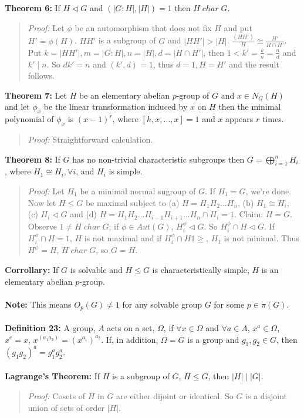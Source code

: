 {\bf Theorem 6:}
If $H \lhd G$ and $(|G:H|, |H|)=1$ then $H \; char \; G$.
\begin{quote}
\emph{Proof:}  Let $\phi$ be an automorphism that does not fix $H$ and put $H'= \phi(H)$.
$H H'$ is a subgroup of $G$ and
$|H H'| > |H|$.  ${\frac {(H H')} {H}} \cong {\frac {H'} {H \cap H'}}$.
Put $k= |H H'|, m= |G:H|, n= |H|, d= | H \cap H' |$,  then $ 1 < k'= {\frac {k} {n}} =  {\frac n d}$ and $k' \mid n$.  So $dk'= n$ and $(k', d)=1$,
thus $d=1, H = H'$ and the result follows.
\end{quote}
{\bf Theorem 7:}
Let $H$ be an elementary abelian $p$-group of $G$ and $x \in N_G(H)$ and let $\phi_x$
be the linear transformation induced by $x$ on $H$ then the minimal polynomial of
$\phi_x$ is $(x-1)^r$, where $[h,x, \ldots, x]= 1$ and $x$ appears $r$ times.
\begin{quote}
\emph{Proof:}  Straightforward calculation.
\end{quote}
{\bf Theorem 8:}  If $G$ has no non-trivial characteristic subgroups then
$G= \bigoplus_{i=1}^n H_i$, where $H_1 \cong H_i, \forall i$, and $H_i$ is
simple.
\begin{quote}
\emph{Proof:} Let $H_1$ be a minimal normal sugroup of $G$.  If $H_1 = G$, we're done.
Now let $H \le G$ be maximal subject to (a) $H=H_1 H_2 \ldots H_n$, (b) $H_1 \cong H_i$,
(c) $H_i \lhd G$ and (d)
$H=H_1 H_2 \ldots H_{i-1} H_{i+1} \ldots H_n \cap H_i = 1$.  Claim:  $H=G$.  Observe
$1 \ne H \; char \; G$; if $\phi \in Aut(G)$, $H_i^{\phi} \lhd G$.
So $H_i^{\phi} \cap H \lhd G$.
If $H_i^{\phi} \cap H =1$, $H$ is not maximal and if
$H_i^{\phi} \cap H 1\ge $, $H_1$ is not minimal.
Thus $H^{\phi} = H$, $H \; char \; G$, so $G=H$.
\end{quote}
{\bf Corrollary:} If $G$ is solvable and $H \le G$ is characteristically simple, $H$
is an elementary abelian $p$-group.
\\
\\
{\bf Note:} This means $O_p(G) \ne 1$ for any solvable group $G$ for some $p \in \pi(G)$.
\\
\\
{\bf Definition 23:} A group, $A$ acts on a set, $\Omega$, if $\forall x \in \Omega$ and $\forall a \in A$,
$x^a \in \Omega$, $x^e = x$, $x^{(a_1 a_2)} = (x^{a_1})^{a_2}$. If, in addition, $\Omega = G$ is a group and
$g_1 , g_2 \in G$, then $(g_1 g_2)^a = g_1^a g_2^a$.
\\
\\
{\bf Lagrange's Theorem:}  If $H$ is a subgroup of $G$, $H \leq G$, then $|H| \mid |G|$.
\begin{quote}
\emph{Proof:}
Cosets of $H$ in $G$ are either dijoint or identical.  So $G$ is a disjoint union of sets of order $|H|$.
\end{quote}

